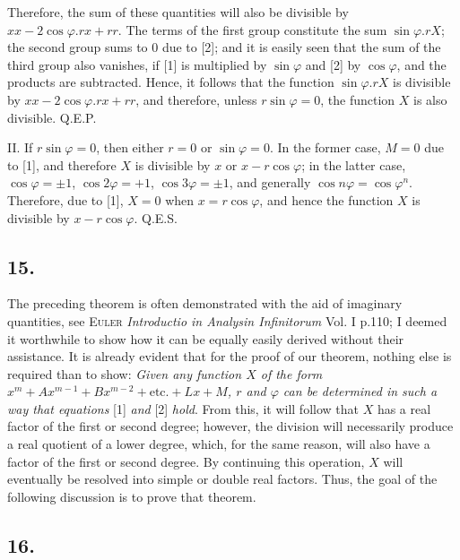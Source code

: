 \documentclass[12pt]{memoir}
\theoremstyle{plain}
\theoremstyle{remark}
\begin{document}
Therefore, the sum of these quantities will also be divisible by \(xx - 2\cos\varphi.rx + rr\). The terms of the first group constitute the sum \(\sin\varphi.rX\); the second group sums to \(0\) due to [2]; and it is easily seen that the sum of the third group also vanishes, if [1] is multiplied by \(\sin \varphi\) and [2] by \(\cos \varphi\), and the products are subtracted. Hence, it follows that the function \(\sin \varphi . r X\) is divisible by \(xx - 2 \cos \varphi .rx +rr\), and therefore, unless \(r \sin \varphi = 0\), the function \(X\) is also divisible. Q.E.P.

II. If \(r \sin \varphi = 0\), then either \(r = 0\) or \(\sin \varphi = 0\). In the former case, \(M=0\) due to [1], and therefore \(X\) is divisible by \(x\) or \(x - r\cos\varphi\); in the latter case, \(\cos \varphi = \pm 1\), \(\cos 2 \varphi = +1\), \(\cos 3 \varphi = \pm 1\), and generally \(\cos n\varphi = \cos \varphi^n\). Therefore, due to [1], \(X=0\) when \(x=r \cos \varphi\), and hence the function \(X\) is divisible by \(x-r\cos\varphi\). Q.E.S.

\subsection*{15.}

The preceding theorem is often demonstrated with the aid of imaginary quantities, see \textsc{Euler} \textit{Introductio in Analysin Infinitorum }Vol. I p.110; I deemed it worthwhile to show how it can be equally easily derived without their assistance. It is already evident that for the proof of our theorem, nothing else is required than to show: \textit{Given any function \(X\) of the form \( x^m + Ax^{m-1}+Bx^{m-2}+\text{etc.} +Lx + M\), \(r\) and \(\varphi\) can be determined in such a way that equations} [1] \textit{and} [2] \textit{hold}. From this, it will follow that \(X\) has a real factor of the first or second degree; however, the division will necessarily produce a real quotient of a lower degree, which, for the same reason, will also have a factor of the first or second degree. By continuing this operation, \(X\) will eventually be resolved into simple or double real factors. Thus, the goal of the following discussion is to prove that theorem.

\subsection*{16.}
\end{document}
